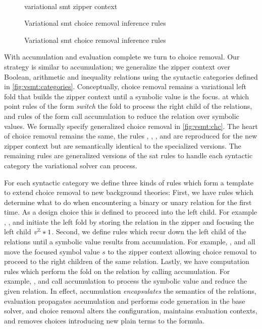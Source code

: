 ~\label{section:vsmt:choice-removal}
% 
\begin{figure}
  
  \caption{variational \ac{smt} zipper context}
  \label{fig:vsmt:zipper}
\end{figure}
%
\begin{figure}
  
  \caption{Variational \ac{smt} choice removal inference rules}%
  \label{fig:vsmt:chc}
\end{figure}
% 
\begin{figure}
  \ContinuedFloat
  
  \caption{Variational \ac{smt} choice removal inference rules}
  \label{fig:vsmt:chc-cont}
\end{figure}
%
With accumulation and evaluation complete we turn to choice removal.
%
Our strategy is similar to accumulation; we generalize the zipper context over
Boolean, arithmetic and inequality relations using the syntactic categories
defined in \autoref{fig:vsmt:categories}.
%
Conceptually, choice removal remains a variational left fold that builds the
zipper context until a symbolic value is the focus. at which point rules of the
form  \emph{switch} the fold to process the right child of the
relations, and rules of the form  call accumulation to reduce the
relation over symbolic values. We formally specify generalized choice removal in
\autoref{fig:vsmt:chc}. The heart of choice removal remains the same, the rules
\crEval, \crChc, \crChcT, and \crChcF are reproduced for the new zipper context
\zipper but are semantically identical to the specialized versions. The
remaining rules are generalized versions of the \ac{sat} rules to handle each
syntactic category the variational solver can process.

For each syntactic category we define three kinds of rules which form a template
to extend choice removal to new background theories: First, we have rules which
determine what to do when encountering a binary or unary relation for the first
time. As a design choice this is defined to proceed into the left child. For
example \crNot{}, \crBool{}, and \crInEq{} initiate the left fold by storing the
relation in the zipper and focusing the left child $\mathit{v^{\mathbb{Z}}}*{1}$.
%
Second, we define rules which recur down the left child of the relations until a
symbolic value results from accumulation. For example, \crInEqL{}, \crBoolL{}
and \crArithL{} all move the focused symbol value $s$ to the zipper context
allowing choice removal to proceed to the right children of the same relation.
%
Lastly, we have computation rules which perform the fold on the relation by
calling accumulation. For example, \crUnaryIn, \crArithR and \crInEqR call
accumulation to process the symbolic value and reduce the given relation. In
effect, accumulation \emph{encapsulates} the semantics of the relations,
evaluation propagates accumulation and performs code generation in the base
solver, and choice removal alters the configuration, maintains evaluation
contexts, and removes choices introducing new plain terms to the formula.

